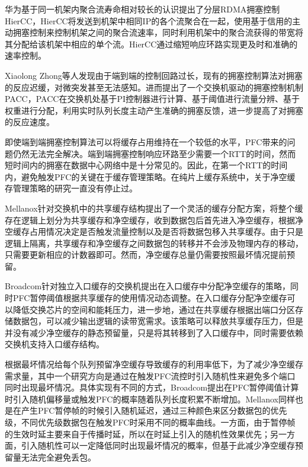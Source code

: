 华为基于同一机架内聚合流寿命相对较长的认识提出了分层RDMA拥塞控制HierCC\cite{zhang2021hiercc}，HierCC将发送到机架中相同IP的各个流聚合在一起，使用基于信用的主动拥塞控制来控制机架之间的聚合流速率，同时利用机架中的聚合流获得的带宽将其分配给该机架中相应的单个流。HierCC通过缩短响应环路实现更及时和准确的速率控制。

Xiaolong Zhong等人发现由于端到端的控制回路过长，现有的拥塞控制算法对拥塞的反应迟缓，对微突发甚至无法感知。进而提出了一个交换机驱动的拥塞控制机制PACC\cite{zhong2022pacc}，PACC在交换机处基于PI控制器进行计算、基于阈值进行流量分辨、基于权重进行分配，利用实时队列长度主动产生准确的拥塞反馈，进一步提高了对拥塞的反应速度。



即使端到端拥塞控制算法可以将缓存占用维持在一个较低的水平，PFC带来的问题仍然无法完全解决。端到端拥塞控制响应环路至少需要一个RTT的时间，然而短时间内的拥塞在数据中心网络中是十分常见的。因此，在第一个RTT的时间内，避免触发PFC的关键在于缓存管理策略。在纯片上缓存系统中，关于净空缓存管理策略的研究一直没有停止过。

Mellanox针对交换机中的共享缓存结构提出了一个灵活的缓存分配方案\cite{flexibleBufferAllocation}，将整个缓存在逻辑上划分为共享缓存和净空缓存，收到数据包后首先进入净空缓存，根据净空缓存占用情况决定是否触发流量控制以及是否将数据包移入共享缓存。由于只是逻辑上隔离，共享缓存和净空缓存之间数据包的转移并不会涉及物理内存的移动，只需要更新相应的计数器即可。然而，净空缓存总量仍需要按照最坏情况提前预留。

Broadcom针对独立入口缓存的交换机提出在入口缓存中分配净空缓存的策略\cite{ingressBuffering}，同时PFC暂停阈值根据共享缓存的使用情况动态调整。在入口缓存分配净空缓存可以降低交换芯片的空间和能耗压力，进一步地，通过在共享缓存根据出端口分区存储数据包，可以减少输出逻辑的读带宽需求。该策略可以释放共享缓存压力，但是并没有减少净空缓存的静态预留量，只是将其转移到了入口缓存中，同时需要依赖交换机支持入口缓存结构。

根据最坏情况给每个队列预留净空缓存导致缓存的利用率低下，为了减少净空缓存需求量，其中一个研究方向是通过在触发PFC流控时引入随机性来避免多个端口同时出现最坏情况。具体实现有不同的方式，Broadcom提出在PFC暂停阈值计算时引入随机偏移量或触发PFC的概率随着队列长度积累不断增加\cite{reducingHeadroom}。Mellanox同样也是在产生PFC暂停帧的时候引入随机延迟，通过三种颜色来区分数据包的优先级，不同优先级数据包在触发PFC时采用不同的概率曲线\cite{losslessBehavior}。一方面，由于暂停帧的生效时延主要来自于传播时延，所以在时延上引入的随机性效果优先；另一方面，引入随机性可以一定降低同时出现最坏情况的概率，但基于此减少净空缓存预留量无法完全避免丢包。

